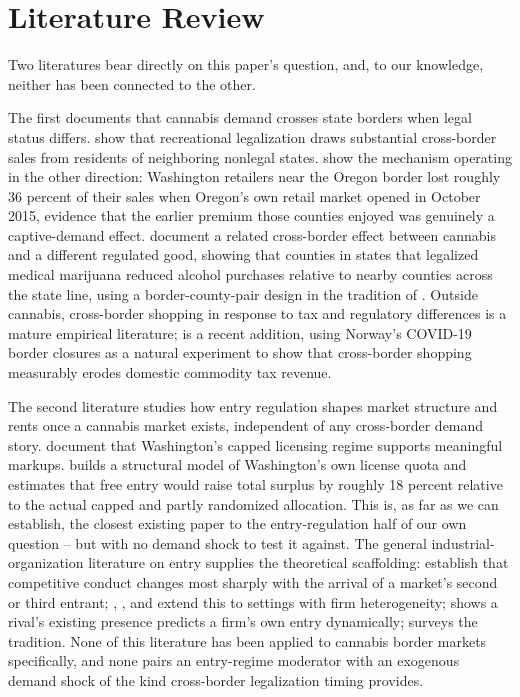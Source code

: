 \documentclass[12pt]{article}
\begin{document}
\section{Literature Review}
\label{sec:lit}

Two literatures bear directly on this paper's question, and, to our knowledge, neither has been connected to
the other.

The first documents that cannabis demand crosses state borders when legal status differs. \citet{HaoCowan2020}
show that recreational legalization draws substantial cross-border sales from residents of neighboring
nonlegal states. \citet{HansenMillerWeber2020} show the mechanism operating in the other direction: Washington
retailers near the Oregon border lost roughly 36 percent of their sales when Oregon's own retail market opened
in October 2015, evidence that the earlier premium those counties enjoyed was genuinely a captive-demand
effect. \citet{BaggioChongKwon2020} document a related cross-border effect between cannabis and a different
regulated good, showing that counties in states that legalized medical marijuana reduced alcohol purchases
relative to nearby counties across the state line, using a border-county-pair design in the tradition of
\citet{DubeLesterReich2010}. Outside cannabis, cross-border shopping in response to tax and regulatory
differences is a mature empirical literature; \citet{FribergEtAl2024} is a recent addition, using Norway's
COVID-19 border closures as a natural experiment to show that cross-border shopping measurably erodes domestic
commodity tax revenue.

The second literature studies how entry regulation shapes market structure and rents once a cannabis market
exists, independent of any cross-border demand story. \citet{HollenbeckUetake2021} document that Washington's
capped licensing regime supports meaningful markups. \citet{Thomas2019LicenseQuotas} builds a structural model
of Washington's own license quota and estimates that free entry would raise total surplus by roughly 18
percent relative to the actual capped and partly randomized allocation. This is, as far as we can establish,
the closest existing paper to the entry-regulation half of our own question -- but with no demand shock to
test it against. The general industrial-organization literature on entry supplies the theoretical scaffolding:
\citet{BresnahanReiss1990,BresnahanReiss1991} establish that competitive conduct changes most sharply with the
arrival of a market's second or third entrant; \citet{Berry1992}, \citet{Mazzeo2002}, and \citet{Seim2006}
extend this to settings with firm heterogeneity; \citet{ToivanenWaterson2005} shows a rival's existing
presence predicts a firm's own entry dynamically; \citet{BerryReiss2007} surveys the tradition. None of this
literature has been applied to cannabis border markets specifically, and none pairs an entry-regime moderator
with an exogenous demand shock of the kind cross-border legalization timing provides.
\end{document}
